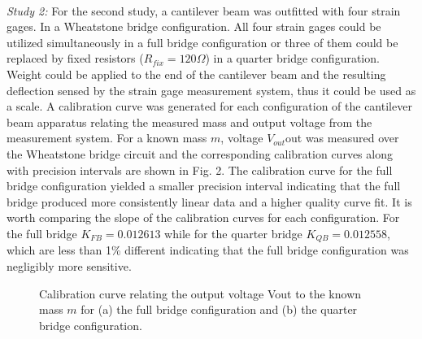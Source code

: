 \documentclass[12pt, letterpaper]{article}
\begin{document}
\mbox{} \\ %
\textit{Study 2:} For the second study, a cantilever beam was outfitted
with four strain gages. In a Wheatstone bridge configuration. All four
strain gages could be utilized simultaneously in a full bridge
configuration or three of them could be replaced by fixed resistors
($R_{fix}  = 120 \Omega$) in a quarter bridge configuration. Weight
could be applied to the end of the cantilever beam and the resulting
deflection sensed by the strain gage measurement system, thus it could
be used as a scale. A calibration curve was generated for each
configuration of the cantilever beam apparatus relating the measured
mass and output voltage from the measurement system.  For a known mass
$m$, voltage $V_{out}$out was  measured  over  the  Wheatstone  bridge
circuit  and  the corresponding calibration curves along with precision
intervals are shown in Fig. 2. The calibration curve for the full bridge
configuration yielded a smaller precision interval indicating that the
full bridge produced more consistently linear data and a higher quality
curve fit.  It is worth comparing the slope of the calibration curves
for each configuration.  For the full bridge $K_{FB} = 0.012613$ while
for the quarter bridge $K_{QB} = 0.012558$, which are less than 1\%
different indicating that the full bridge configuration was negligibly
more sensitive.

\begin{figure}[!ht]
   \begin{center}
    \hfill
   \caption{Calibration curve relating the output voltage Vout to the known mass
       $m$ for (a) the full bridge configuration and (b) the quarter bridge configuration.}
    \label{fig:dummy}
 \end{center}
\end{figure}
\end{document}
